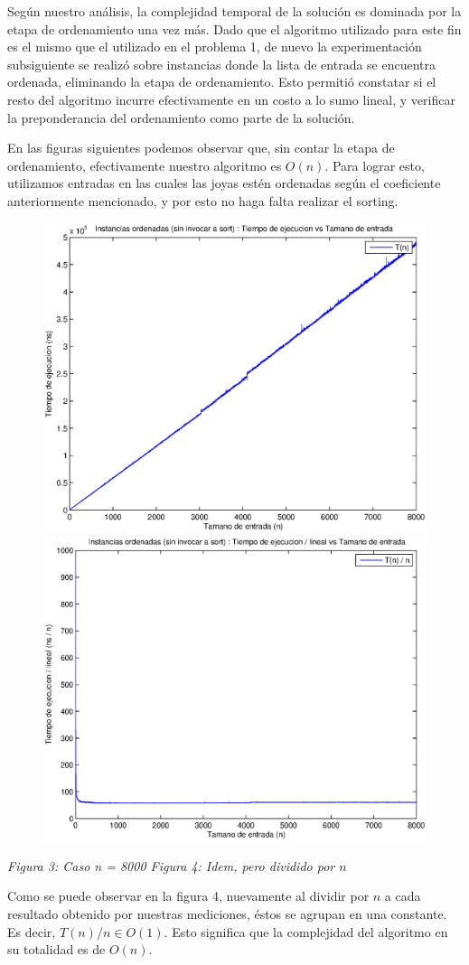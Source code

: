 Según nuestro análisis, la complejidad temporal de la solución es dominada por la etapa de ordenamiento una vez más. Dado que el algoritmo utilizado para este fin es el mismo que el utilizado en el problema 1, de nuevo la experimentación subsiguiente se realizó sobre instancias donde la lista de entrada se encuentra ordenada, eliminando la etapa de ordenamiento. Esto permitió constatar si el resto del algoritmo incurre efectivamente en un costo a lo sumo lineal, y verificar la preponderancia del ordenamiento como parte de la solución.

En las figuras siguientes podemos observar que, sin contar la etapa de ordenamiento, efectivamente nuestro algoritmo es $O(n)$. Para lograr esto, utilizamos entradas en las cuales las joyas estén ordenadas según el coeficiente anteriormente mencionado, y por esto no haga falta realizar el sorting.

\begin{figure}[H]
    \includegraphics[width=0.5\linewidth]{problema2/graficos/problema2_ordenada_8000.eps}
    \includegraphics[width=0.5\linewidth]{problema2/graficos/problema2_ordenada_8000_div_n.eps}
\end{figure}
\emph{\hspace{2,5cm}Figura 3: Caso n = 8000 \hspace{3cm}Figura 4: Idem, pero dividido por $n$}

Como se puede observar en la figura 4, nuevamente al dividir por $n$ a cada resultado obtenido por nuestras mediciones, éstos se agrupan en una constante. Es decir, $T(n)/n \in O(1)$. Esto significa que la complejidad del algoritmo en su totalidad es de $O(n)$.


